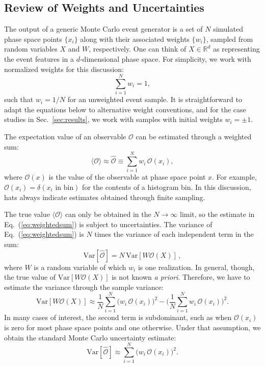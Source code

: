 \documentclass[prd,twocolumn,superscriptaddress,longbibliography,preprintnumbers,floatfix,nofootinbib]{revtex4-1}
\DeclareRobustCommand{\Sec}[1]{Sec.~\ref{sec:#1}}
\DeclareRobustCommand{\Eq}[1]{Eq.~(\ref{eq:#1})}
\begin{document}
\subsection{Review of Weights and Uncertainties}

The output of a generic Monte Carlo event generator is a set of $N$ simulated phase space points $\{x_i\}$ along with their associated weights $\{w_i\}$, sampled from random variables $X$ and $W$, respectively.
%
One can think of $X\in\mathbb{R}^d$ as representing the event features in a $d$-dimensional phase space.
%
For simplicity, we work with normalized weights for this discussion:
%
\begin{equation}
\label{eq:weightnorm}
\sum_{i=1}^N w_i = 1,
\end{equation}
%
such that $w_i=1/N$ for an unweighted event sample.
%
It is straightforward to adapt the equations below to alternative weight conventions, and for the case studies in \Sec{results}, we work with samples with initial weights $w_i = \pm 1$.


The expectation value of an observable $\mathcal{O}$ can be estimated through a weighted sum:
%
\begin{equation}
\label{eq:weightedsum}
\langle \mathcal{O}\rangle \approx\widehat{\mathcal{O}}\equiv \sum_{i=1}^N w_i \, \mathcal{O}(x_i),
\end{equation}
%
where $\mathcal{O}(x)$ is the value of the observable at phase space point $x$.
%
For example, $\mathcal{O}(x_i)=\delta{(\text{$x_i$ in bin})}$ for the contents of a histogram bin.
%
In this discussion, hats always indicate estimates obtained through finite sampling.


The true value $\langle \mathcal{O}\rangle$ can only be obtained in the $N \to \infty$ limit, so the estimate in \Eq{weightedsum} is subject to uncertainties.
%
The variance of \Eq{weightedsum} is $N$ times the variance of each independent term in the sum:
%
\begin{equation}
\text{Var}[\widehat{\mathcal{O}}] = N\, \text{Var}[W\mathcal{O}(X)]\,,
\end{equation}
%
where $W$ is a random variable of which $w_i$ is one realization.
%
In general, though, the true value of $\text{Var}[W\mathcal{O}(X)]$ is not known \emph{a priori}.
%
Therefore, we have to estimate the variance through the sample variance:
%
\begin{equation}
\text{Var}[W\mathcal{O}(X)] \approx \frac{1}{N}\sum_{i=1}^N\Big(w_i\,\mathcal{O}(x_i)\Big)^2 -\bigg(\frac{1}{N}\sum_{i=1}^N w_i\,\mathcal{O}(x_i)\bigg)^2.
\end{equation}
%
In many cases of interest, the second term is subdominant, such as when $\mathcal{O}(x_i)$ is zero for most phase space points and one otherwise.
%
Under that assumption, we obtain the standard Monte Carlo uncertainty estimate:
%
\begin{equation}
\label{eq:MCuncertainty}
\text{Var}[\widehat{\mathcal{O}}] \approx \sum_{i=1}^N \Big(w_i\,\mathcal{O}(x_i)\Big)^2.
\end{equation}
\end{document}
